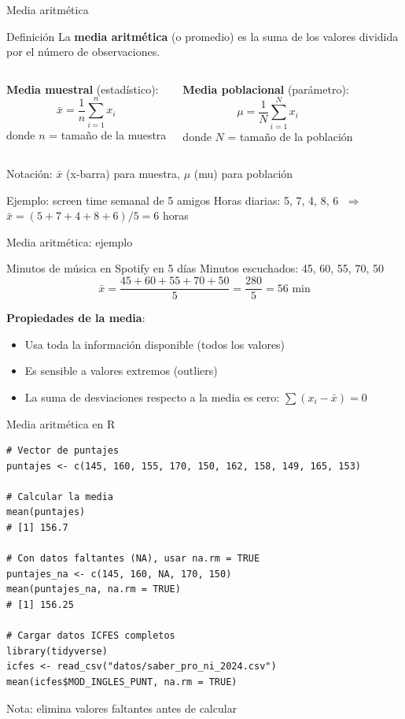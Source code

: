 \documentclass[aspectratio=169, 11pt]{beamer}
\begin{document}
\begin{frame}{Media aritmética}
\begin{block}{Definición}
La \textbf{media aritmética} (o promedio) es la suma de los valores dividida por el número de observaciones.
\end{block}

\begin{columns}[T]
\textbf{Media muestral} (estadístico):
\[
\bar{x} = \frac{1}{n} \sum_{i=1}^n x_i
\]
donde $n$ = tamaño de la muestra

\textbf{Media poblacional} (parámetro):
\[
\mu = \frac{1}{N} \sum_{i=1}^N x_i
\]
donde $N$ = tamaño de la población
\end{columns}

\vspace{0.5em}
\alert{Notación}: $\bar{x}$ (x-barra) para muestra, $\mu$ (mu) para población

\begin{exampleblock}{Ejemplo: screen time semanal de 5 amigos}
Horas diarias: 5, 7, 4, 8, 6 $\;\Rightarrow\;$ $\bar{x} = (5+7+4+8+6)/5 = 6$ horas
\end{exampleblock}
\end{frame}

\begin{frame}{Media aritmética: ejemplo}
\begin{exampleblock}{Minutos de m\'usica en Spotify en 5 d\'ias}
Minutos escuchados: 45, 60, 55, 70, 50
\[
\bar{x} = \frac{45 + 60 + 55 + 70 + 50}{5} = \frac{280}{5} = 56 \text{ min}
\]
\end{exampleblock}

\vspace{1em}
\textbf{Propiedades de la media}:
\begin{itemize}
\item Usa toda la información disponible (todos los valores)
\item Es sensible a valores extremos (outliers)
\item La suma de desviaciones respecto a la media es cero: $\sum(x_i - \bar{x}) = 0$
\end{itemize}
\end{frame}

\begin{frame}[fragile]{Media aritmética en R}
\begin{lstlisting}
# Vector de puntajes
puntajes <- c(145, 160, 155, 170, 150, 162, 158, 149, 165, 153)

# Calcular la media
mean(puntajes)
# [1] 156.7

# Con datos faltantes (NA), usar na.rm = TRUE
puntajes_na <- c(145, 160, NA, 170, 150)
mean(puntajes_na, na.rm = TRUE)
# [1] 156.25

# Cargar datos ICFES completos
library(tidyverse)
icfes <- read_csv("datos/saber_pro_ni_2024.csv")
mean(icfes$MOD_INGLES_PUNT, na.rm = TRUE)
\end{lstlisting}

\alert{Nota}:  elimina valores faltantes antes de calcular
\end{frame}
\end{document}
